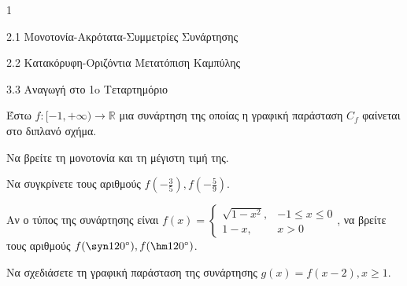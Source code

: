 \begin{ylh}{1}
\item 2.1 Μονοτονία-Ακρότατα-Συμμετρίες Συνάρτησης
\item 2.2 Κατακόρυφη-Οριζόντια Μετατόπιση Καμπύλης
\item 3.3 Αναγωγή στο 1o Τεταρτημόριο
\end{ylh}
Έστω $f: [-1, +\infty) \to \mathbb{R}$ μια συνάρτηση της οποίας η γραφική παράσταση $C_f$ φαίνεται στο διπλανό σχήμα.
\begin{center}
\end{center}
\begin{alist}
\item Να βρείτε τη μονοτονία και τη μέγιστη τιμή της.
\item Να συγκρίνετε τους αριθμούς $f\left(-\frac{3}{5}\right), f\left(-\frac{5}{9}\right)$.
\item Αν ο τύπος της συνάρτησης είναι $f(x) = \begin{cases} \sqrt{1 - x^2}, & -1 \leq x \leq 0 \\ 1 - x, & x > 0 \end{cases}$, να βρείτε τους αριθμούς $f(\syn  120^\circ), f(\hm  120^\circ)$.
\item Να σχεδιάσετε τη γραφική παράσταση της συνάρτησης $g(x) = f(x - 2), x \geq 1$.
\end{alist}

